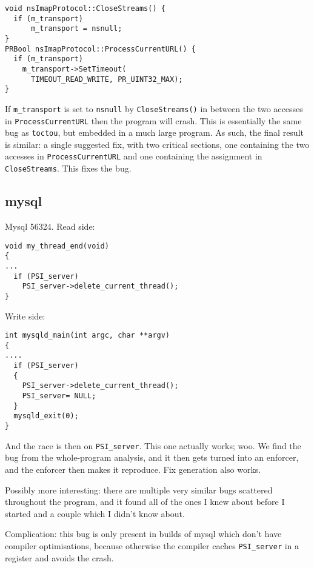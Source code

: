 \begin{verbatim}
void nsImapProtocol::CloseStreams() {
  if (m_transport)
      m_transport = nsnull;
}
PRBool nsImapProtocol::ProcessCurrentURL() {
  if (m_transport)
    m_transport->SetTimeout(
      TIMEOUT_READ_WRITE, PR_UINT32_MAX);
}
\end{verbatim}

\noindent
If \verb|m_transport| is set to \verb|nsnull| by \verb|CloseStreams()|
in between the two accesses in \verb|ProcessCurrentURL| then the
program will crash.  This is essentially the same bug as
\verb|toctou|, but embedded in a much large program.  As such, the
final result is similar: a single suggested fix, with two critical
sections, one containing the two accesses in \verb|ProcessCurrentURL|
and one containing the assignment in \verb|CloseStreams|.  This fixes
the bug.

\subsection{mysql}

Mysql 56324.  Read side:

\begin{verbatim}
void my_thread_end(void)
{
...
  if (PSI_server)
    PSI_server->delete_current_thread();
}
\end{verbatim}

Write side:

\begin{verbatim}
int mysqld_main(int argc, char **argv)
{
....
  if (PSI_server)
  {
    PSI_server->delete_current_thread();
    PSI_server= NULL;
  }
  mysqld_exit(0);
}
\end{verbatim}

And the race is then on \verb|PSI_server|.  This one actually works;
woo.  We find the bug from the whole-program analysis, and it then
gets turned into an enforcer, and the enforcer then makes it
reproduce.  Fix generation also works.

Possibly more interesting: there are multiple very similar bugs
scattered throughout the program, and it found all of the ones I knew
about before I started and a couple which I didn't know about.

Complication: this bug is only present in builds of mysql which don't
have compiler optimisations, because otherwise the compiler caches
\verb|PSI_server| in a register and avoids the crash.


